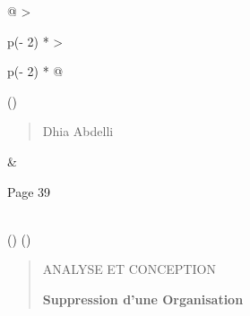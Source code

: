 \documentclass[
]{article}
\begin{document}
\begin{longtable}[]{@{}
  >{\raggedright\arraybackslash}p{(\columnwidth - 2\tabcolsep) * }
  >{\raggedright\arraybackslash}p{(\columnwidth - 2\tabcolsep) * }@{}}
\toprule()
\begin{minipage}[b]{\linewidth}\raggedright
\begin{quote}
Dhia Abdelli
\end{quote}
\end{minipage} & \begin{minipage}[b]{\linewidth}\raggedright
Page 39
\end{minipage} \\
\midrule()
\endhead
\bottomrule()
\end{longtable}

\begin{quote}
ANALYSE ET CONCEPTION

\textbf{Suppression d'une Organisation}
\end{quote}
\end{document}
